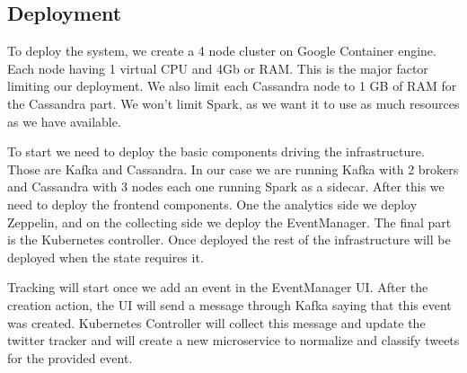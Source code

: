 \subsection{Deployment}

To deploy the system, we create a 4 node cluster on Google Container engine. Each node having 1 virtual CPU and 4Gb or RAM. This is the major factor limiting our deployment. We also limit each Cassandra node to 1 GB of RAM for the Cassandra part. We won’t limit Spark, as we want it to use as much resources as we have available. 

To start we need to deploy the basic components driving the infrastructure. Those are Kafka and Cassandra. In our case we are running Kafka with 2 brokers and Cassandra with 3 nodes each one running Spark as a sidecar. After this we need to deploy the frontend components. One the analytics side we deploy Zeppelin, and on the collecting side we deploy the EventManager. The final part is the Kubernetes controller. Once deployed the rest of the infrastructure will be deployed when the state requires it.

Tracking will start once we add an event in the EventManager UI. After the creation action, the UI will send a message through Kafka saying that this event was created. Kubernetes Controller will collect this message and update the twitter tracker and will create a new microservice to normalize and classify tweets for the provided event.

